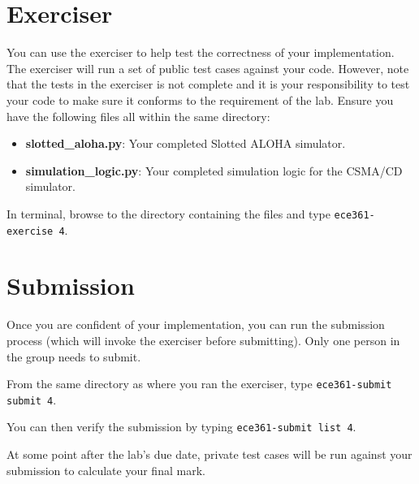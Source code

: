 \documentclass[11pt]{article}
\def\thelab{4}
\begin{document}

\section{Exerciser}
\label{sec:exercise}
You can use the exerciser to help test the correctness of your implementation.
The exerciser will run a set of public test cases against your code.
However, note that the tests in the exerciser is not complete and it is your responsibility to test your code to make sure it conforms to the requirement of the lab.
Ensure you have the following files all within the same directory:
\begin{itemize}
    \item \textbf{slotted\_aloha.py}: Your completed Slotted ALOHA simulator.
    \item \textbf{simulation\_logic.py}: Your completed simulation logic for the CSMA/CD simulator.
\end{itemize}

In terminal, browse to the directory containing the files and type \texttt{ece361-exercise \thelab}.

\section{Submission}
\label{sec:submission}
Once you are confident of your implementation, you can run the submission process (which will invoke the exerciser before submitting).
Only one person in the group needs to submit.

From the same directory as where you ran the exerciser, type \texttt{ece361-submit submit \thelab}.

You can then verify the submission by typing \texttt{ece361-submit list \thelab}.

At some point after the lab's due date, private test cases will be run against your submission to calculate your final mark.
\end{document}
